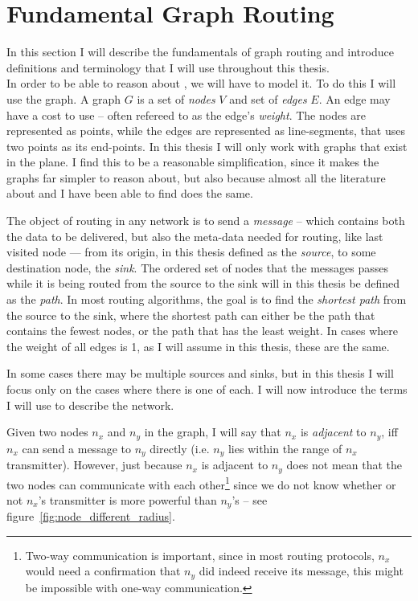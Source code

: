 \section{Fundamental Graph Routing}
\label{fundamental}
In this section I will describe the fundamentals of graph routing and introduce definitions and terminology that I will use throughout this thesis.\\

In order to be able to reason about \manet, we will have to model it. To do this I will use the graph. A graph $G$ is a set of \emph{nodes} $V$ and set of \emph{edges} $E$. An edge may have a cost to use -- often refereed to as the edge's \emph{weight}. The nodes are represented as points, while the edges are represented as line-segments, that uses two points as its end-points. In this thesis I will only work with graphs that exist in the plane. I find this to be a reasonable simplification, since it makes the graphs far simpler to reason about, but also because almost all the literature about \manet and \anet I have been able to find does the same. 

The object of routing in any network is to send a \emph{message} -- which contains both the data to be delivered, but also the meta-data needed for routing, like last visited node --- from its origin, in this thesis defined as the \emph{source}, to some destination node, the \emph{sink}. The ordered set of nodes that the messages passes while it is being routed from the source to the sink will in this thesis be defined as the \emph{path}. In most routing algorithms, the goal is to find the \emph{shortest path} from the source to the sink, where the shortest path can either be the path that contains the fewest nodes, or the path that has the least weight. In cases where the weight of all edges is 1, as I will assume in this thesis, these are the same. 

In some cases there may be multiple sources and sinks, but in this thesis I will focus only on the cases where there is one of each. I will now introduce the terms I will use to describe the network.


Given two nodes $n_x$ and $n_y$ in the graph, I will say that $n_x$ is \emph{adjacent} to $n_y$, iff $n_x$ can send a message to $n_y$ directly (i.e. $n_y$ lies within the range of $n_x$ transmitter). However, just because $n_x$ is adjacent to $n_y$ does not mean that the two nodes can communicate with each other\footnote{Two-way communication is important, since in most routing protocols, $n_x$ would need a confirmation that $n_y$ did indeed receive its message, this might be impossible with one-way communication.} since we do not know whether or not $n_x$'s transmitter is more powerful than $n_y$'s -- see figure~\ref{fig:node_different_radius}. 

